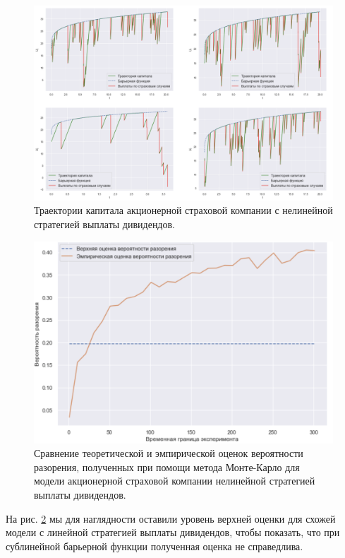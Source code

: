 \documentclass{article}
\theoremstyle{plain}
\theoremstyle{plain}
\theoremstyle{plain}
\theoremstyle{plain}
\theoremstyle{definition}
\theoremstyle{remark}
\begin{document}
\begin{figure}[h]
\centering
\includegraphics[scale=0.5]{images/nonlinear_barrier_trajectory.png}
\captionsetup{justification=centering}
\caption{Траектории капитала акционерной страховой компании с нелинейной стратегией выплаты дивидендов.}
\label{nonlinear_stock_trajectory}
\end{figure}

\begin{figure}[h]
\centering
\includegraphics[scale=0.6]{images/non_linear_barrier_MC.png}
\captionsetup{justification=centering}
\caption{Сравнение теоретической и эмпирической оценок вероятности разорения, полученных при помощи метода Монте-Карло для модели акционерной страховой компании нелинейной стратегией выплаты дивидендов.}
\label{nonlinear_MC}
\end{figure}

На рис. \ref{nonlinear_MC} мы для наглядности оставили уровень верхней оценки для схожей модели с линейной стратегией выплаты дивидендов, чтобы показать, что при сублинейной барьерной функции полученная оценка не справедлива.
\end{document}
